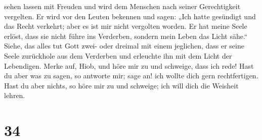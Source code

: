 sehen lassen mit Freuden und wird dem Menschen nach seiner Gerechtigkeit
vergelten.  Er wird vor den Leuten bekennen und sagen:
„Ich hatte gesündigt und das Recht verkehrt; aber es ist mir nicht
vergolten worden.  Er hat meine Seele erlöst, dass sie
nicht führe ins Verderben, sondern mein Leben das Licht sähe.``
 Siehe, das alles tut Gott zwei- oder dreimal mit einem
jeglichen,  dass er seine Seele zurückhole aus dem
Verderben und erleuchte ihn mit dem Licht der Lebendigen.
 Merke auf, Hiob, und höre mir zu und schweige, dass ich
rede!  Hast du aber was zu sagen, so antworte mir; sage
an! ich wollte dich gern rechtfertigen.  Hast du aber
nichts, so höre mir zu und schweige; ich will dich die Weisheit lehren.

\hypertarget{section-33}{%
\section{34}\label{section-33}}

